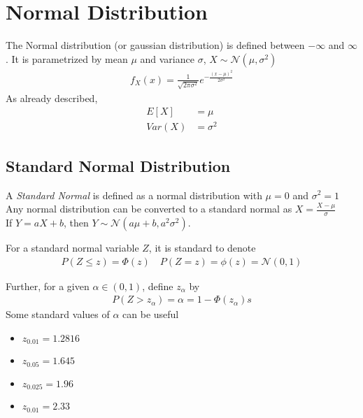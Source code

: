 \documentclass[../../probability-notes.tex]{subfiles}
\begin{document}
    \section{Normal Distribution}
    The Normal distribution (or gaussian distribution) is defined between $-\infty$ and $\infty$. It is parametrized by mean $\mu$ and variance $\sigma$, $X \sim \mathcal{N}(\mu, \sigma^{2})$
    \begin{align*}
        f_{X}(x) = \frac{1}{\sqrt{2\pi \sigma^{2}}} e^{-\frac{(x-\mu)^{2}}{2 \sigma^{2}}}
    \end{align*}
    As already described,
    \begin{align*}
        E[X] &= \mu\\
        Var(X) &= \sigma^{2}
    \end{align*}

    \subsection{Standard Normal Distribution}
    A \emph{Standard Normal} is defined as a normal distribution with $\mu = 0$ and $\sigma^{2} = 1$\\
    Any normal distribution can be converted to a standard normal as $X = \frac{X - \mu}{\sigma}$\\
    If $Y = aX + b$, then $Y \sim \mathcal{N}(a \mu + b, a^{2}\sigma^{2})$.\newline

    For a standard normal variable $Z$, it is standard to denote
    \begin{align*}
        P(Z \leq z) = \Phi(z) \quad P(Z = z) = \phi(z) = \mathcal{N}(0,1)
    \end{align*}

    Further, for a given $\alpha \in (0,1)$, define $z_{\alpha}$ by
    \begin{align*}
        P(Z > z_{\alpha}) = \alpha = 1-\Phi(z_{\alpha})s
    \end{align*}
    Some standard values of $\alpha$ can be useful
    \begin{itemize}
        \item $z_{0.01} = 1.2816$
        \item $z_{0.05} = 1.645$
        \item $z_{0.025} = 1.96$
        \item $z_{0.01} = 2.33$
    \end{itemize}
\end{document}

